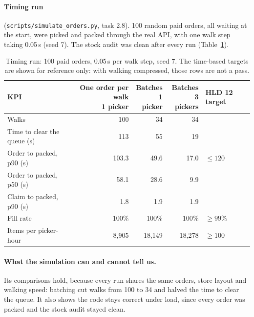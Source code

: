 \paragraph{Timing run} (\texttt{scripts/simulate\_orders.py}, task 2.8). 100 random paid orders, all waiting at the
start, were picked and packed through the real API, with one walk step taking 0.05\,s (seed 7). The stock audit was
clean after every run (Table~\ref{tab:timing-run}).

\begin{table}[ht]
  \centering
  \small
  \begin{tabular}{@{}lrrrl@{}}
    \toprule
    KPI & \shortstack[r]{One order per walk\\1 picker} & \shortstack[r]{Batches\\1 picker}
        & \shortstack[r]{Batches\\3 pickers} & HLD 12 target \\
    \midrule
    Walks                       & 100      & 34       & 34       &               \\
    Time to clear the queue (s) & 113      & 55       & 19       &               \\
    Order to packed, p90 (s)    & 103.3    & 49.6     & 17.0     & $\le 120$     \\
    Order to packed, p50 (s)    & 58.1     & 28.6     & 9.9      &               \\
    Claim to packed, p90 (s)    & 1.8      & 1.9      & 1.9      &               \\
    Fill rate                   & 100\%    & 100\%    & 100\%    & $\ge 99\%$    \\
    Items per picker-hour       & 8{,}905  & 18{,}149 & 18{,}278 & $\ge 100$     \\
    \bottomrule
  \end{tabular}
  \caption{Timing run: 100 paid orders, 0.05\,s per walk step, seed 7. The time-based targets are shown for
    reference only: with walking compressed, those rows are not a pass.}
  \label{tab:timing-run}
\end{table}

\paragraph{What the simulation can and cannot tell us.} Its comparisons hold, because every run shares the same orders,
store layout and walking speed: batching cut walks from 100 to 34 and halved the time to clear the queue. It also
shows the code stays correct under load, since every order was packed and the stock audit stayed clean.

